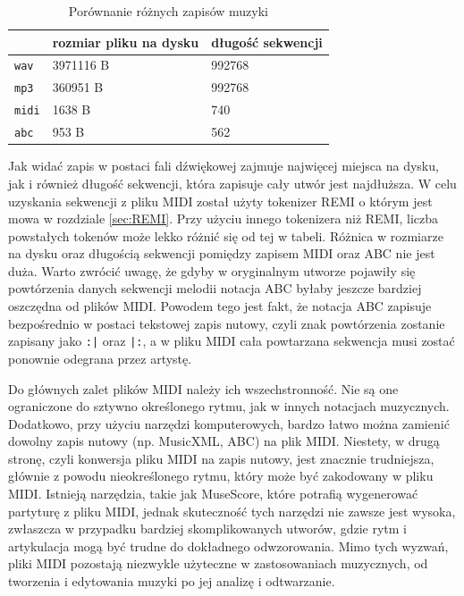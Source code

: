 \documentclass[data-science]{agh-wi} %
\begin{document}
\begin{table}[ht!]
    \centering
    \begin{tabular}{|l|l|l|}
        \hline
                      & rozmiar pliku na dysku & długość sekwencji \\ \hline
        \texttt{wav}  & 3971116 B              & 992768            \\ \hline
        \texttt{mp3}  & 360951 B               & 992768            \\ \hline
        \texttt{midi} & 1638 B                 & 740               \\ \hline
        \texttt{abc}  & 953 B                  & 562               \\ \hline
    \end{tabular}
    \caption{Porównanie różnych zapisów muzyki}\label{tab:music_diff}
\end{table}

Jak widać zapis w postaci fali dźwiękowej zajmuje najwięcej miejsca na dysku, jak i również długość sekwencji, która zapisuje cały utwór jest najdłuższa. W celu uzyskania sekwencji z pliku MIDI został użyty tokenizer REMI o którym jest mowa w rozdziale \ref*{sec:REMI}. Przy użyciu innego tokenizera niż REMI, liczba powstałych tokenów może lekko różnić się od tej w tabeli. Różnica w rozmiarze na dysku oraz długością sekwencji pomiędzy zapisem MIDI oraz ABC nie jest duża. Warto zwrócić uwagę, że gdyby w oryginalnym utworze pojawiły się powtórzenia danych sekwencji melodii notacja ABC byłaby jeszcze bardziej oszczędna od plików MIDI. Powodem tego jest fakt, że notacja ABC zapisuje bezpośrednio w postaci tekstowej zapis nutowy, czyli znak powtórzenia zostanie zapisany jako \texttt{:|} oraz \texttt{|:}, a w pliku MIDI cała powtarzana sekwencja musi zostać ponownie odegrana przez artystę.

Do głównych zalet plików MIDI należy ich wszechstronność. Nie są one ograniczone do sztywno określonego rytmu, jak w innych notacjach muzycznych. Dodatkowo, przy użyciu narzędzi komputerowych, bardzo łatwo można zamienić dowolny zapis nutowy (np. MusicXML, ABC) na plik MIDI. Niestety, w drugą stronę, czyli konwersja pliku MIDI na zapis nutowy, jest znacznie trudniejsza, głównie z powodu nieokreślonego rytmu, który może być zakodowany w pliku MIDI. Istnieją narzędzia, takie jak MuseScore, które potrafią wygenerować partyturę z pliku MIDI, jednak skuteczność tych narzędzi nie zawsze jest wysoka, zwłaszcza w przypadku bardziej skomplikowanych utworów, gdzie rytm i artykulacja mogą być trudne do dokładnego odwzorowania. Mimo tych wyzwań, pliki MIDI pozostają niezwykle użyteczne w zastosowaniach muzycznych, od tworzenia i edytowania muzyki po jej analizę i odtwarzanie.
\end{document}
